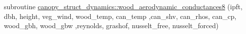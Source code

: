 \begin{DoxyCompactItemize}
\item 
subroutine \hyperlink{namespacecanopy__struct__dynamics_ac0b8111bae6ded12c5757262b058d989}{canopy\+\_\+struct\+\_\+dynamics\+::wood\+\_\+aerodynamic\+\_\+conductances8} (ipft, dbh, height, veg\+\_\+wind, wood\+\_\+temp, can\+\_\+temp                                                                                                                                                                                   ,can\+\_\+shv, can\+\_\+rhos, can\+\_\+cp, wood\+\_\+gbh, wood\+\_\+gbw                                                                                                                                                                                           ,reynolds, grashof, nusselt\+\_\+free, nusselt\+\_\+forced)
\end{DoxyCompactItemize}
